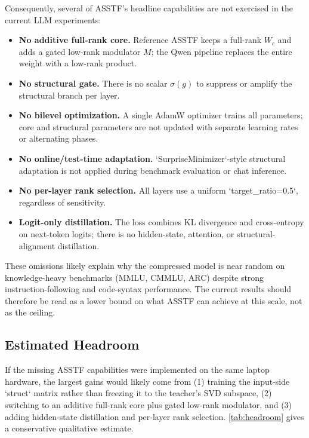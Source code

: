 \documentclass[11pt,a4paper]{article}
\theoremstyle{definition}
\begin{document}
Consequently, several of ASSTF's headline capabilities are not exercised in the current LLM experiments:

\begin{itemize}
    \item \textbf{No additive full-rank core.} Reference ASSTF keeps a full-rank $W_c$ and adds a gated low-rank modulator $M$; the Qwen pipeline replaces the entire weight with a low-rank product.
    \item \textbf{No structural gate.} There is no scalar $\sigma(g)$ to suppress or amplify the structural branch per layer.
    \item \textbf{No bilevel optimization.} A single AdamW optimizer trains all parameters; core and structural parameters are not updated with separate learning rates or alternating phases.
    \item \textbf{No online/test-time adaptation.} `SurpriseMinimizer`-style structural adaptation is not applied during benchmark evaluation or chat inference.
    \item \textbf{No per-layer rank selection.} All layers use a uniform `target\_ratio=0.5`, regardless of sensitivity.
    \item \textbf{Logit-only distillation.} The loss combines KL divergence and cross-entropy on next-token logits; there is no hidden-state, attention, or structural-alignment distillation.
\end{itemize}

These omissions likely explain why the compressed model is near random on knowledge-heavy benchmarks (MMLU, CMMLU, ARC) despite strong instruction-following and code-syntax performance. The current results should therefore be read as a lower bound on what ASSTF can achieve at this scale, not as the ceiling.

\subsection{Estimated Headroom}
\label{subsec:headroom}

If the missing ASSTF capabilities were implemented on the same laptop hardware, the largest gains would likely come from (1) training the input-side `struct` matrix rather than freezing it to the teacher's SVD subspace, (2) switching to an additive full-rank core plus gated low-rank modulator, and (3) adding hidden-state distillation and per-layer rank selection. \cref{tab:headroom} gives a conservative qualitative estimate.
\end{document}
